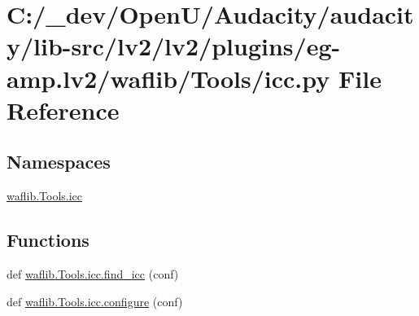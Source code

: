 \hypertarget{lv2_2plugins_2eg-amp_8lv2_2waflib_2_tools_2icc_8py}{}\section{C\+:/\+\_\+dev/\+Open\+U/\+Audacity/audacity/lib-\/src/lv2/lv2/plugins/eg-\/amp.lv2/waflib/\+Tools/icc.py File Reference}
\label{lv2_2plugins_2eg-amp_8lv2_2waflib_2_tools_2icc_8py}
\subsection*{Namespaces}
\begin{DoxyCompactItemize}
\item 
 \hyperlink{namespacewaflib_1_1_tools_1_1icc}{waflib.\+Tools.\+icc}
\end{DoxyCompactItemize}
\subsection*{Functions}
\begin{DoxyCompactItemize}
\item 
def \hyperlink{namespacewaflib_1_1_tools_1_1icc_ac87401e53461cf3742295c6ca369977a}{waflib.\+Tools.\+icc.\+find\+\_\+icc} (conf)
\item 
def \hyperlink{namespacewaflib_1_1_tools_1_1icc_a29b371f4c4eaba47d7b198073638bfd9}{waflib.\+Tools.\+icc.\+configure} (conf)
\end{DoxyCompactItemize}
